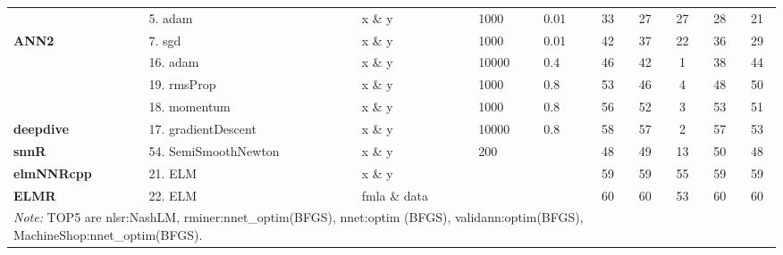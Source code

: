 \begin{Schunk}
\begin{table}[!h]
\begin{tabular}[t]{>{}lllllccccc}
 & 5. adam & x \& y & 1000 & 0.01 & 33 & 27 & 27 & 28 & 21\\

\multirow{-3}{*}{\raggedright\arraybackslash \textbf{ANN2}} & 7. sgd & x \& y & 1000 & 0.01 & 42 & 37 & 22 & 36 & 29\\
\cmidrule{1-10}
 & 16. adam & x \& y & 10000 & 0.4 & 46 & 42 & 1 & 38 & 44\\

 & 19. rmsProp & x \& y & 1000 & 0.8 & 53 & 46 & 4 & 48 & 50\\

 & 18. momentum & x \& y & 1000 & 0.8 & 56 & 52 & 3 & 53 & 51\\

\multirow{-4}{*}{\raggedright\arraybackslash \textbf{deepdive}} & 17. gradientDescent & x \& y & 10000 & 0.8 & 58 & 57 & 2 & 57 & 53\\
\cmidrule{1-10}
\textbf{snnR} & 54. SemiSmoothNewton & x \& y & 200 &  & 48 & 49 & 13 & 50 & 48\\
\cmidrule{1-10}
\textbf{elmNNRcpp} & 21. ELM & x \& y &  &  & 59 & 59 & 55 & 59 & 59\\
\cmidrule{1-10}
\textbf{ELMR} & 22. ELM & fmla \& data &  &  & 60 & 60 & 53 & 60 & 60\\
\bottomrule
\multicolumn{10}{l}{\rule{0pt}{1em}\textit{Note: } TOP5 are nlsr:NashLM, rminer:nnet\_optim(BFGS), nnet:optim (BFGS), validann:optim(BFGS), MachineShop:nnet\_optim(BFGS).}\\
\end{tabular}
\end{table}

\end{Schunk}

